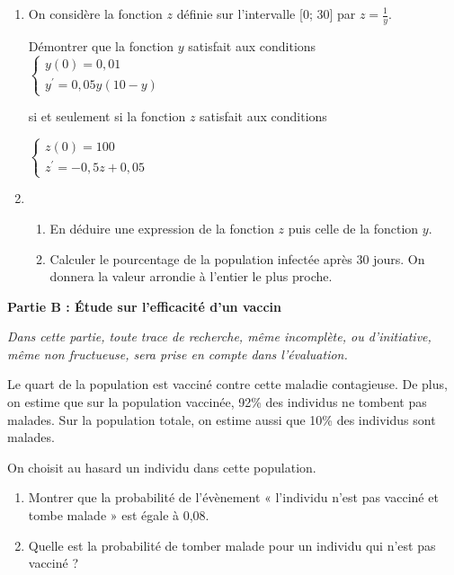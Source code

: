 \begin{enumerate}
     \item
     On considère la fonction $z$ définie sur l'intervalle [0; 30] par $z=\frac{1}{y}$.
     \par
     Démontrer que la fonction $y$ satisfait aux conditions 
\\
$\left\{ \begin{matrix} y\left(0\right)=0,01 \\ y^{\prime}=0,05y\left(10-y\right)\end{matrix}\right.$ 
\par
si et seulement si la fonction $z$  satisfait aux conditions 
\par
$\left\{ \begin{matrix} z\left(0\right)=100 \\ z^{\prime}=- 0,5z+0,05\end{matrix}\right.$
               \item
               \begin{enumerate}[label=\alph*.]
                    \item
                    En déduire une expression de la fonction $z$ puis celle de la fonction $y$.
                    \item
                    Calculer le pourcentage de la population infectée après 30 jours. On donnera la valeur arrondie à l'entier le plus proche.
               \end{enumerate}
          \end{enumerate}
          \textbf{Partie B : Étude sur l'efficacité d'un vaccin}
\par
          \textit{Dans cette partie, toute trace de recherche, même incomplète, ou d'initiative, même non fructueuse, sera prise en compte dans l'évaluation.}
\par
          Le quart de la population est vacciné contre cette maladie contagieuse. De plus, on estime que sur la population vaccinée, 92\% des individus ne tombent pas malades. Sur la population totale, on estime aussi que 10\% des individus sont malades.
          \par
          On choisit au hasard un individu dans cette population.
          \begin{enumerate}
               \item
               Montrer que la probabilité de l'évènement « l'individu n'est pas vacciné et tombe malade » est égale à 0,08.
               \item
               Quelle est la probabilité de tomber malade pour un individu qui n'est pas vacciné ?
          \end{enumerate}
